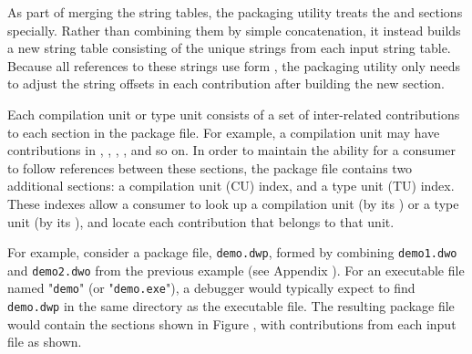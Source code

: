 As part of merging the string tables, the packaging utility
treats the \dotdebugstrdwo{} and \dotdebugstroffsetsdwo{}
sections specially. Rather than
combining them by simple concatenation, it instead builds a new
string table consisting of the unique strings from each input
string table. Because all references to these strings use
form \DWFORMstrx{},
the packaging utility only needs to adjust the
string offsets in each \dotdebugstroffsetsdwo{} contribution after
building the new \dotdebugstrdwo{} section.

Each compilation unit or type unit consists of a set of
inter-related contributions to each section in the package file.
For example, a compilation unit may have contributions in
\dotdebuginfodwo{}, \dotdebugabbrevdwo{}, \dotdebuglinedwo{},
\dotdebugstroffsetsdwo{}, and so on. In order to maintain the ability 
for a consumer to follow references between these sections, the
package file contains two additional sections: a compilation unit
(CU) index, and a type unit (TU) index. These indexes allow a
consumer to look up a compilation unit (by its \CUsignature) or 
a type unit (by its \TUsignature), and locate each contribution 
that belongs to that unit.

For example, consider a package file, \texttt{demo.dwp}, formed by
combining \texttt{demo1.dwo} and \texttt{demo2.dwo} from the previous example
(see Appendix ). 
For an executable file named "\texttt{demo}" (or "\texttt{demo.exe}"), a debugger would
typically expect to find \texttt{demo.dwp} in the same directory as the
executable file.
The resulting package file would contain the sections shown in Figure
, 
with contributions from each input file as shown.

